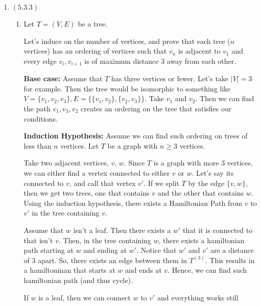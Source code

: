\documentclass[12pt]{article}
\begin{document}

\begin{enumerate}[start=1,label={\bfseries Problem \arabic*:},leftmargin=1in] %
    \item $(5.3.3)$ \begin{enumerate}
        \item Let $T = (V, E)$ be a tree. 
        
        Let's induce on the number of vertices, and prove that each tree ($n$ vertices) has an ordering of vertices such that $v_{n}$ is adjacent to $v_{1}$ and every edge $v_{i}, v_{i+1}$ is of maximum distance $3$ away from each other.  

        \textbf{Base case:} Assume that $T$ has three vertices or fewer. Let's take $|V| = 3$ for example. 
        Then the tree would be isomorphic to something like $V = \{ v_{1}, v_{2}, v_{3} \}, E = \{ \{ v_{1}, v_{2}\}, \{v_{2}, v_{3}\} \}$.
        Take $v_{1}$ and $v_{2}$. Then we can find the path $v_{1}, v_{3}, v_{2}$ creates an ordering on the tree that satisfies our conditions. 

        \textbf{Induction Hypothesis:} Assume we can find such ordering on trees of less than $n$ vertices. 
        Let $T$ be a graph with $n \geq 3$ vertices. 

        Take two adjacent vertices, $v$, $w$. Since $T$ is a graph with more 3 vertices, we can either find a vertex connected to either $v$ or $w$. Let's say its connected to $v$, and call that vertex $v'$.
        If we split $T$ by the edge $\{v, w\}$, then we get two trees, one that contains $v$ and the other that contains $w$. 
        Using the induction hypothesis, there exists a Hamiltonian Path from $v$ to $v'$ in the tree containing $v$. 

        Assume that $w$ isn't a leaf. Then there exists a $w'$ that it is connected to that isn't $v$. Then, in the tree containing $w$, there exists a hamiltonian path starting at $w$ and ending at $w'$. 
        Notice that $w'$ and $v'$ are a distance of $3$ apart. So, there exists an edge between them in $T^{(3)}$. This results in a hamiltoninan that starts at $w$ and ends at $v$. Hence, we can find such hamiltonian path (and thus cycle). 

        If $w$ is a leaf, then we can connect $w$ to $v'$ and everything works still 
        

\end{enumerate}
\end{enumerate}
\end{document}

